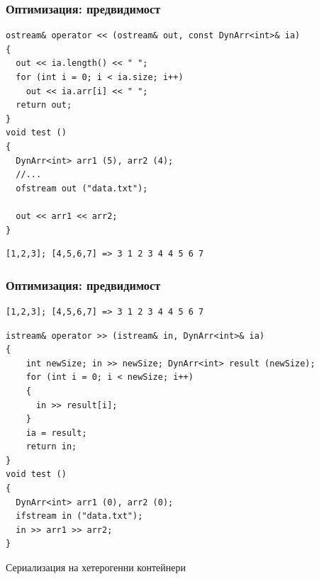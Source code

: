 \documentclass{beamer}
\begin{document}
\begin{frame}[fragile]
\frametitle{Оптимизация: предвидимост}


\begin{flushleft}
\begin{lstlisting}
ostream& operator << (ostream& out, const DynArr<int>& ia)
{
  out << ia.length() << " ";
  for (int i = 0; i < ia.size; i++)
    out << ia.arr[i] << " ";
  return out;
}
void test ()
{
  DynArr<int> arr1 (5), arr2 (4);
  //...
  ofstream out ("data.txt");

  out << arr1 << arr2;
}
\end{lstlisting}  
\end{flushleft}

\begin{lstlisting}
[1,2,3]; [4,5,6,7] => 3 1 2 3 4 4 5 6 7
\end{lstlisting}  

\end{frame}




\begin{frame}[fragile]
\frametitle{Оптимизация: предвидимост}

\begin{lstlisting}
[1,2,3]; [4,5,6,7] => 3 1 2 3 4 4 5 6 7
\end{lstlisting}  

\begin{flushleft}
\begin{lstlisting}
istream& operator >> (istream& in, DynArr<int>& ia)
{
    int newSize; in >> newSize; DynArr<int> result (newSize);
    for (int i = 0; i < newSize; i++)
    {
      in >> result[i];
    }
    ia = result;
    return in;
}
void test ()
{
  DynArr<int> arr1 (0), arr2 (0);
  ifstream in ("data.txt");
  in >> arr1 >> arr2;
}
\end{lstlisting}  
\end{flushleft}


\end{frame}


\begin{frame}
\centerline{Сериализация на хетерогенни контейнери}
\end{frame}
\end{document}
